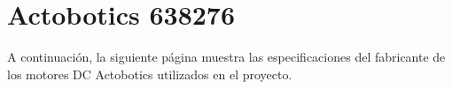 \chapter{Actobotics 638276}

A continuación, la siguiente página muestra las especificaciones del fabricante de los motores DC Actobotics utilizados en el proyecto.




